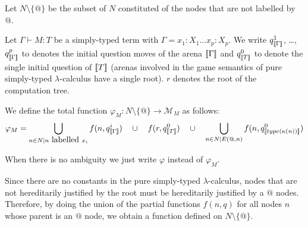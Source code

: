 Let $N\setminus \{@\}$ be the subset of $N$ constituted of the nodes that are not labelled by $@$.
\begin{dfn}
Let $\Gamma \vdash M : T$ be a simply-typed term
with $\Gamma = x_1:X_1 \ldots x_p : X_p$.
We write $q_{{[\![ \Gamma ]\!]}}^1$, \ldots, $q_{{[\![ \Gamma ]\!]}}^p$ to denotes the initial question moves of the arena ${[\![ \Gamma ]\!]}$ and $q^0_{[\![ T ]\!]}$ to denote the single initial question of ${[\![ T ]\!]}$ (arenas involved in the game semantics of pure simply-typed $\lambda$-calculus have a single root).
$r$ denotes the root of the computation tree.

We define the total function $\varphi_M : N\setminus \{@\} \rightarrow \mathcal{M}_M$ as follows:
$$\varphi_M =  \bigcup_{n \in N | n \mbox{ labelled } x_i }  f(n, q^i_{{[\![ \Gamma ]\!]}} )
    \quad  \cup \quad
        f(r, q^0_{{[\![ T ]\!]}})
    \quad  \cup \quad
        \bigcup_{n \in N | E(@,n)}  f(n, q^0_{{[\![ type(\kappa(n)) ]\!]}} )
$$
\end{dfn}
When there is no ambiguity we just write $\varphi$ instead of $\varphi_M$.

Since there are no constants in the pure simply-typed $\lambda$-calculus, nodes that are not hereditarily justified
by the root must be hereditarily justified by a $@$ nodes. Therefore, by doing the union of the partial functions $f(n,q)$
for all nodes $n$ whose parent is an $@$ node, we obtain a function defined on $N\setminus \{@\}$.

